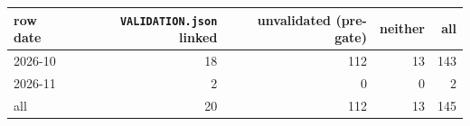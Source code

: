 \begin{tabular}{@{}lrrrr@{}}
\toprule
row date & \texttt{VALIDATION.json} linked & unvalidated (pre-gate) & neither & all \\
\midrule
2026-10 & 18 & 112 & 13 & 143 \\
2026-11 & 2 & 0 & 0 & 2 \\
\midrule
all & 20 & 112 & 13 & 145 \\
\bottomrule
\end{tabular}
